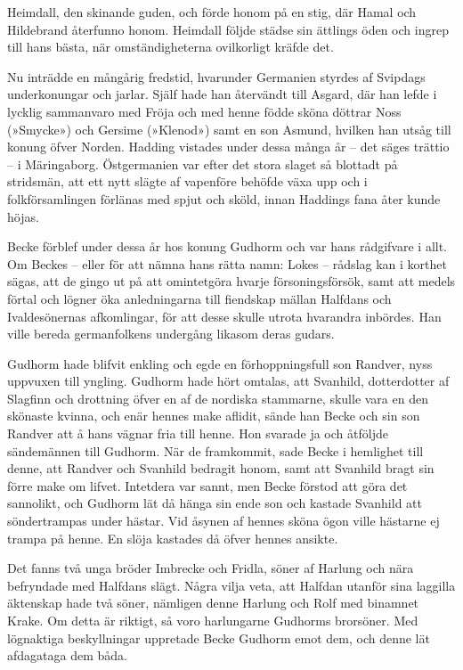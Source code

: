 Heimdall, den skinande guden, och förde honom på en stig, där Hamal och
Hildebrand återfunno honom. Heimdall följde städse sin ättlings öden och
ingrep till hans bästa, när omständigheterna ovilkorligt kräfde det.



Nu inträdde en mångårig fredstid, hvarunder Germanien styrdes af
Svipdags underkonungar och jarlar. Själf hade han återvändt till Asgard,
där han lefde i lycklig sammanvaro med Fröja och med henne födde sköna
döttrar Noss (»Smycke») och Gersime (»Klenod») samt en son Asmund,
hvilken han utsåg till konung öfver Norden. Hadding vistades under dessa
många år -- det säges trättio -- i Märingaborg. Östgermanien var efter
det stora slaget så blottadt på stridsmän, att ett nytt slägte af
vapenföre behöfde växa upp och i folkförsamlingen förlänas med spjut och
sköld, innan Haddings fana åter kunde höjas.

Becke förblef under dessa år hos konung Gudhorm och var hans rådgifvare
i allt. Om Beckes -- eller för att nämna hans rätta namn: Lokes --
rådslag kan i korthet sägas, att de gingo ut på att omintetgöra hvarje
försoningsförsök, samt att medels förtal och lögner öka anledningarna
till fiendskap mällan Halfdans och Ivaldesönernas afkomlingar, för att
desse skulle utrota hvarandra inbördes. Han ville bereda germanfolkens
undergång likasom deras gudars.

Gudhorm hade blifvit enkling och egde en förhoppningsfull son Randver,
nyss uppvuxen till yngling. Gudhorm hade hört omtalas, att Svanhild,
dotterdotter af Slagfinn och drottning öfver en af de nordiska
stammarne, skulle vara en den skönaste kvinna, och enär hennes make
aflidit, sände han Becke och sin son Randver att å hans vägnar fria till
henne. Hon svarade ja och åtföljde sändemännen till Gudhorm. När de
framkommit, sade Becke i hemlighet till denne, att
Randver
och Svanhild bedragit honom, samt att Svanhild bragt sin förre make om
lifvet. Intetdera var sannt, men Becke förstod att göra det sannolikt,
och Gudhorm lät då hänga sin ende son och kastade Svanhild att
söndertrampas under hästar. Vid åsynen af hennes sköna ögon ville
hästarne ej trampa på henne. En slöja kastades då öfver hennes ansikte.

Det fanns två unga bröder Imbrecke och Fridla, söner af Harlung och nära
befryndade med Halfdans slägt. Några vilja veta, att Halfdan utanför
sina laggilla äktenskap hade två söner, nämligen denne Harlung och Rolf
med binamnet Krake. Om detta är riktigt, så voro harlungarne Gudhorms
brorsöner. Med lögnaktiga beskyllningar uppretade Becke Gudhorm emot
dem, och denne lät afdagataga dem båda.

